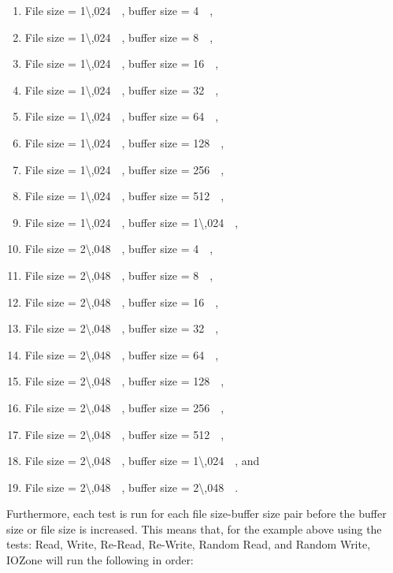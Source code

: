 \begin{enumerate}
	\item File size = \SI{1\,024}{\kilo\byte}, buffer size = \SI{4}{\kilo\byte},
	\item File size = \SI{1\,024}{\kilo\byte}, buffer size = \SI{8}{\kilo\byte},
	\item File size = \SI{1\,024}{\kilo\byte}, buffer size = \SI{16}{\kilo\byte},
	\item File size = \SI{1\,024}{\kilo\byte}, buffer size = \SI{32}{\kilo\byte},
	\item File size = \SI{1\,024}{\kilo\byte}, buffer size = \SI{64}{\kilo\byte},
	\item File size = \SI{1\,024}{\kilo\byte}, buffer size = \SI{128}{\kilo\byte},
	\item File size = \SI{1\,024}{\kilo\byte}, buffer size = \SI{256}{\kilo\byte},
	\item File size = \SI{1\,024}{\kilo\byte}, buffer size = \SI{512}{\kilo\byte},
	\item File size = \SI{1\,024}{\kilo\byte}, buffer size = \SI{1\,024}{\kilo\byte},
	\item File size = \SI{2\,048}{\kilo\byte}, buffer size = \SI{4}{\kilo\byte},
	\item File size = \SI{2\,048}{\kilo\byte}, buffer size = \SI{8}{\kilo\byte},
	\item File size = \SI{2\,048}{\kilo\byte}, buffer size = \SI{16}{\kilo\byte},
	\item File size = \SI{2\,048}{\kilo\byte}, buffer size = \SI{32}{\kilo\byte},
	\item File size = \SI{2\,048}{\kilo\byte}, buffer size = \SI{64}{\kilo\byte},
	\item File size = \SI{2\,048}{\kilo\byte}, buffer size = \SI{128}{\kilo\byte},
	\item File size = \SI{2\,048}{\kilo\byte}, buffer size = \SI{256}{\kilo\byte},
	\item File size = \SI{2\,048}{\kilo\byte}, buffer size = \SI{512}{\kilo\byte},
	\item File size = \SI{2\,048}{\kilo\byte}, buffer size = \SI{1\,024}{\kilo\byte}, and
	\item File size = \SI{2\,048}{\kilo\byte}, buffer size = \SI{2\,048}{\kilo\byte}.
\end{enumerate}
Furthermore, each test is run for each file size-buffer size pair before the buffer size or file size is increased. This means that, for the example above using the tests: Read, Write, Re-Read, Re-Write, Random Read, and Random Write, IOZone will run the following in order:
